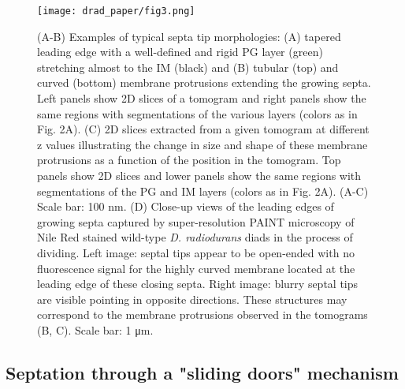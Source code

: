\begin{figure}
    \centering
    \texttt{[image: drad\_paper/fig3.png]}
    \label{drad_fig3}
\end{figure}
\begin{figure}
    \ContinuedFloat
    \caption[]{(A-B) Examples of typical septa tip morphologies: (A) tapered leading edge with a well-defined and rigid PG layer (green) stretching almost to the IM (black) and (B) tubular (top) and curved (bottom) membrane protrusions extending the growing septa. Left panels show 2D slices of a tomogram and right panels show the same regions with segmentations of the various layers (colors as in Fig. 2A). (C) 2D slices extracted from a given tomogram at different z values illustrating the change in size and shape of these membrane protrusions as a function of the position in the tomogram. Top panels show 2D slices and lower panels show the same regions with segmentations of the PG and IM layers (colors as in Fig. 2A). (A-C) Scale bar: 100 nm. (D) Close-up views of the leading edges of growing septa captured by super-resolution PAINT microscopy of Nile Red stained wild-type \textit{D. radiodurans} diads in the process of dividing. Left image: septal tips appear to be open-ended with no fluorescence signal for the highly curved membrane located at the leading edge of these closing septa. Right image: blurry septal tips are visible pointing in opposite directions. These structures may correspond to the membrane protrusions observed in the tomograms (B, C). Scale bar: 1 μm.}
\end{figure}

\FloatBarrier

\subsection{Septation through a "sliding doors" mechanism}

